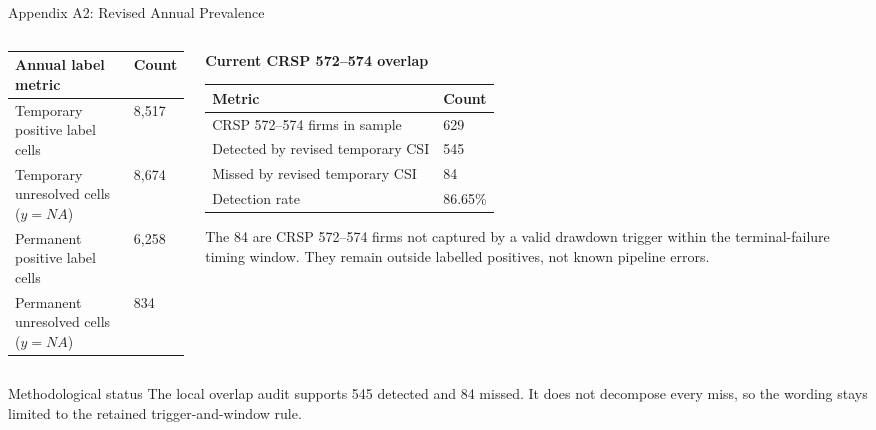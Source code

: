 \documentclass[10pt]{beamer}\usepackage[]{graphicx}\usepackage[table]{xcolor}
\begin{document}
\begin{frame}{Appendix A2: Revised Annual Prevalence}
\scriptsize
\begin{columns}[t]
\begin{column}{0.45\textwidth}
\begin{table}[ht]
\centering
\begin{tabular}{L{4.1cm}R{1.35cm}}
\toprule
Annual label metric & Count \\
\midrule
Temporary positive label cells & 8,517 \\
Temporary unresolved cells ($y=NA$) & 8,674 \\
Permanent positive label cells & 6,258 \\
Permanent unresolved cells ($y=NA$) & 834 \\
\bottomrule
\end{tabular}
\end{table}
\end{column}
\begin{column}{0.53\textwidth}
\textbf{Current CRSP 572--574 overlap}
\begin{table}[ht]
\centering
\begin{tabular}{L{3.7cm}R{0.9cm}}
\toprule
Metric & Count \\
\midrule
CRSP 572--574 firms in sample & 629 \\
Detected by revised temporary CSI & 545 \\
Missed by revised temporary CSI & 84 \\
Detection rate & 86.65\% \\
\bottomrule
\end{tabular}
\end{table}

\vspace{-0.2em}
\scriptsize
The 84 are CRSP 572--574 firms not captured by a valid drawdown trigger within the terminal-failure timing window. They remain outside labelled positives, not known pipeline errors.
\end{column}
\end{columns}

\vspace{0.2em}
\begin{alertblock}{Methodological status}
\scriptsize
The local overlap audit supports 545 detected and 84 missed. It does not decompose every miss, so the wording stays limited to the retained trigger-and-window rule.
\end{alertblock}
\end{frame}
\end{document}
